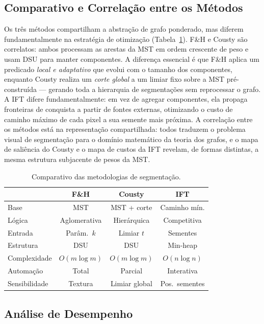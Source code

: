\documentclass{sbc2023}
\begin{document}
\subsection{Comparativo e Correlação entre os Métodos}

Os três métodos compartilham a abstração de grafo ponderado, mas diferem
fundamentalmente na estratégia de otimização (Tabela~\ref{tab:comp}). F\&H e
Cousty são correlatos: ambos processam as arestas da MST em ordem crescente de
peso e usam DSU para manter componentes. A diferença essencial é que F\&H aplica
um predicado \emph{local e adaptativo} que evolui com o tamanho dos componentes,
enquanto Cousty realiza um \emph{corte global} a um limiar fixo sobre a MST
pré-construída — gerando toda a hierarquia de segmentações sem reprocessar o
grafo. A IFT difere fundamentalmente: em vez de agregar componentes, ela propaga
fronteiras de conquista a partir de fontes externas, otimizando o custo de
caminho máximo de cada pixel a sua semente mais próxima. A correlação entre os
métodos está na representação compartilhada: todos traduzem o problema visual
de segmentação para o domínio matemático da teoria dos grafos, e o mapa de
saliência do Cousty e o mapa de custos da IFT revelam, de formas distintas, a
mesma estrutura subjacente de pesos da MST.

\begin{table}[t]
\caption{Comparativo das metodologias de segmentação.}
\label{tab:comp}
\centering
\small
\begin{tabular}{@{}lccc@{}}
\hline\hline
 & \textbf{F\&H} & \textbf{Cousty} & \textbf{IFT} \\
\hline
Base          & MST           & MST + corte     & Caminho mín.  \\
Lógica        & Aglomerativa  & Hierárquica     & Competitiva   \\
Entrada       & Parâm.\ $k$   & Limiar $t$      & Sementes      \\
Estrutura     & DSU           & DSU             & Min-heap      \\
Complexidade  & $O(m\log m)$  & $O(m\log m)$    & $O(n\log n)$  \\
Automação     & Total         & Parcial         & Interativa    \\
Sensibilidade & Textura       & Limiar global   & Pos.\ sementes \\
\hline\hline
\end{tabular}
\end{table}

\subsection{Análise de Desempenho}
\end{document}
